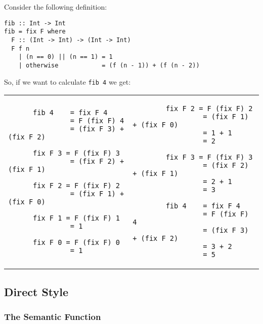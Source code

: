 \documentclass[a4paper, 12pt, twoside]{article}
\begin{document}
Consider the following definition:

\begin{lstlisting}
fib :: Int -> Int
fib = fix F where
  F :: (Int -> Int) -> (Int -> Int)
  F f n
    | (n == 0) || (n == 1) = 1
    | otherwise            = (f (n - 1)) + (f (n - 2))
\end{lstlisting}

\newpage

So, if we want to calculate \texttt{fib 4} we get: \begin{center}
  \begin{tabular}{ l l }
    \begin{lstlisting}
      fib 4    = fix F 4
               = F (fix F) 4
               = (fix F 3) + (fix F 2)
      
      fix F 3 = F (fix F) 3
               = (fix F 2) + (fix F 1)
      
      fix F 2 = F (fix F) 2
               = (fix F 1) + (fix F 0)
      
      fix F 1 = F (fix F) 1
               = 1
      
      fix F 0 = F (fix F) 0
               = 1
      \end{lstlisting}
      &
      \begin{lstlisting}
        fix F 2 = F (fix F) 2
                 = (fix F 1) + (fix F 0)
                 = 1 + 1
                 = 2
        
        fix F 3 = F (fix F) 3
                 = (fix F 2) + (fix F 1)
                 = 2 + 1
                 = 3
        
        fib 4    = fix F 4
                 = F (fix F) 4
                 = (fix F 3) + (fix F 2)
                 = 3 + 2
                 = 5
      \end{lstlisting}
  \end{tabular}
\end{center}

\subsection{Direct Style}

\subsubsection{The Semantic Function} 
\end{document}
